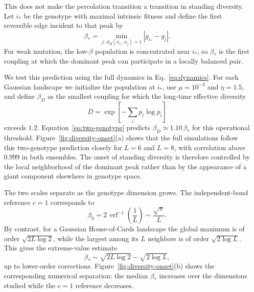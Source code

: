 \documentclass[11pt,reqno]{amsart}
\begin{document}
This does not make the percolation transition a transition in standing diversity. Let $i_*$ be the genotype with maximal intrinsic fitness and define the first reversible edge incident to that peak by
\begin{equation}
\beta_*
=
\min_{j:\,d_H(x_{i_*},x_j)=1}
|g_{i_*}-g_j|.
\label{eq:peak-threshold}
\end{equation}
For weak mutation, the low-$\beta$ population is concentrated near $i_*$, so $\beta_*$ is the first coupling at which the dominant peak can participate in a locally balanced pair.

We test this prediction using the full dynamics in Eq.~\eqref{eq:dynamics}. For each Gaussian landscape we initialize the population at $i_*$, use $\mu=10^{-3}$ and $\eta=1.5$, and define $\beta_D$ as the smallest coupling for which the long-time effective diversity
\begin{equation}
D
=
\exp\left[
-\sum_i p_i\log p_i
\right]
\label{eq:diversity}
\end{equation}
exceeds $1.2$. Equation~\eqref{eq:two-genotype} predicts $\beta_D\simeq1.10\,\beta_*$ for this operational threshold. Figure~\ref{fig:diversity-onset}(a) shows that the full simulations follow this two-genotype prediction closely for $L=6$ and $L=8$, with correlation above $0.999$ in both ensembles. The onset of standing diversity is therefore controlled by the local neighborhood of the dominant peak rather than by the appearance of a giant component elsewhere in genotype space.

The two scales separate as the genotype dimension grows. The independent-bond reference $c=1$ corresponds to
\begin{equation}
\beta_0
=
2\,\operatorname{erf}^{-1}\left(\frac{1}{L}\right)
\sim
\frac{\sqrt{\pi}}{L}.
\label{eq:independent-scale}
\end{equation}
By contrast, for a Gaussian House-of-Cards landscape the global maximum is of order $\sqrt{2L\log 2}$, while the largest among its $L$ neighbors is of order $\sqrt{2\log L}$. This gives the extreme-value estimate
\begin{equation}
\beta_*
\sim
\sqrt{2L\log 2}
-
\sqrt{2\log L},
\label{eq:peak-scale}
\end{equation}
up to lower-order corrections. Figure~\ref{fig:diversity-onset}(b) shows the corresponding numerical separation: the median $\beta_*$ increases over the dimensions studied while the $c=1$ reference decreases.
\end{document}
